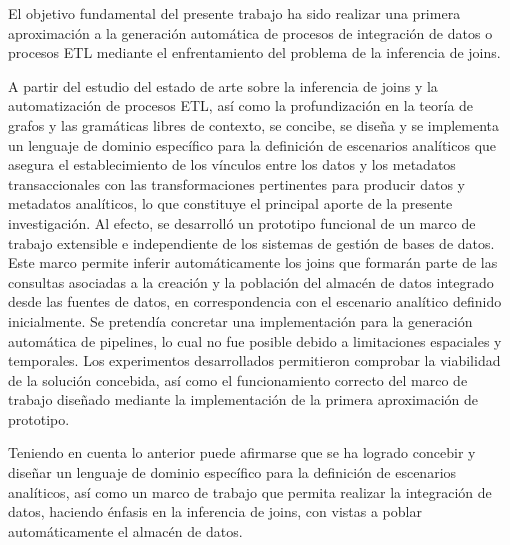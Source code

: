 \begin{conclusions}
    El objetivo fundamental del presente trabajo ha sido realizar una primera aproximaci\'on a la generaci\'on 
    autom\'atica de procesos de integración de datos o procesos ETL mediante el enfrentamiento del problema de la inferencia de joins. 

    A partir del estudio del estado de arte sobre la inferencia de joins y la automatizaci\'on de procesos ETL, así 
    como la profundización en la teoría de grafos y las gramáticas libres de contexto, se concibe, se diseña y se 
    implementa un lenguaje de 
    dominio espec\'ifico para la definici\'on de escenarios anal\'iticos que asegura el establecimiento de los 
    vínculos entre los datos y los metadatos transaccionales con las transformaciones pertinentes para producir 
    datos y metadatos analíticos, lo que constituye el principal aporte de la 
    presente investigaci\'on. Al efecto, se desarrolló un prototipo funcional de un marco de trabajo extensible 
    e independiente de los sistemas de gestión de bases de datos. Este marco permite inferir automáticamente 
    los joins que formarán parte de las consultas asociadas a la creación y la población del almacén de datos 
    integrado desde las fuentes de datos, en correspondencia con el escenario analítico definido inicialmente. Se 
    pretendía concretar una implementación para la generación automática de pipelines, lo cual no fue posible 
    debido a limitaciones espaciales y temporales. Los experimentos desarrollados permitieron 
    comprobar la viabilidad de la solución concebida, así como el funcionamiento correcto del marco de trabajo 
    diseñado mediante la implementación de la primera aproximación de prototipo.

    Teniendo en cuenta lo anterior puede afirmarse que se ha logrado concebir y diseñar un lenguaje de dominio específico para la definición de escenarios
    analíticos, así como un marco de trabajo que permita realizar la integración de
    datos, haciendo énfasis en la inferencia de joins, con vistas a poblar automáticamente
    el almacén de datos.
\end{conclusions}

